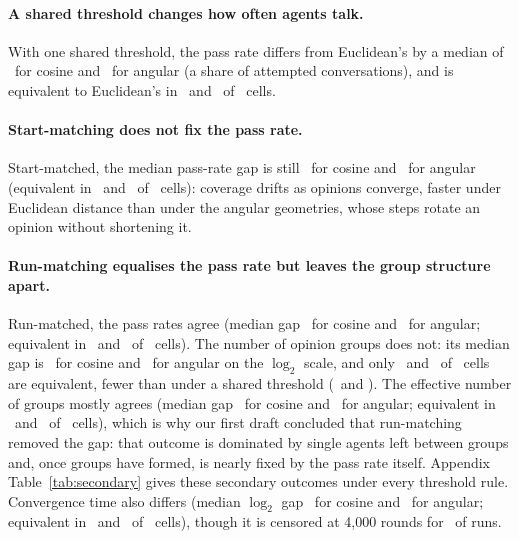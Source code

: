 \documentclass[11pt]{article}
\begin{document}
\paragraph{A shared threshold changes how often agents talk.}
With one shared threshold, the pass rate differs from Euclidean's by a median of \VRawPassGapCos\ for cosine and \VRawPassGapAng\ for angular (a share of attempted conversations), and is equivalent to Euclidean's in \VRawPassEquivCos\ and \VRawPassEquivAng\ of \VCellsPerGeom\ cells.

\paragraph{Start-matching does not fix the pass rate.}
Start-matched, the median pass-rate gap is still \VTzeroPassGapCos\ for cosine and \VTzeroPassGapAng\ for angular (equivalent in \VTzeroPassEquivCos\ and \VTzeroPassEquivAng\ of \VCellsPerGeom\ cells): coverage drifts as opinions converge, faster under Euclidean distance than under the angular geometries, whose steps rotate an opinion without shortening it.

\paragraph{Run-matching equalises the pass rate but leaves the group structure apart.}
Run-matched, the pass rates agree (median gap \VRunPassGapCos\ for cosine and \VRunPassGapAng\ for angular; equivalent in \VRunPassEquivCos\ and \VRunPassEquivAng\ of \VCellsPerGeom\ cells).
The number of opinion groups does not: its median gap is \VRunGroupGapCos\ for cosine and \VRunGroupGapAng\ for angular on the $\log_2$ scale, and only \VRunGroupEquivCos\ and \VRunGroupEquivAng\ of \VCellsPerGeom\ cells are equivalent, fewer than under a shared threshold (\VRawGroupEquivCos\ and \VRawGroupEquivAng).
The effective number of groups mostly agrees (median gap \VRunEffGroupsGapCos\ for cosine and \VRunEffGroupsGapAng\ for angular; equivalent in \VRunEffGroupsEquivCos\ and \VRunEffGroupsEquivAng\ of \VCellsPerGeom\ cells), which is why our first draft concluded that run-matching removed the gap: that outcome is dominated by single agents left between groups and, once groups have formed, is nearly fixed by the pass rate itself.
Appendix Table~\ref{tab:secondary} gives these secondary outcomes under every threshold rule.
Convergence time also differs (median $\log_2$ gap \VRunConvGapCos\ for cosine and \VRunConvGapAng\ for angular; equivalent in \VRunConvEquivCos\ and \VRunConvEquivAng\ of \VCellsPerGeom\ cells), though it is censored at 4{,}000 rounds for \VConvCensored\ of runs.
\end{document}
